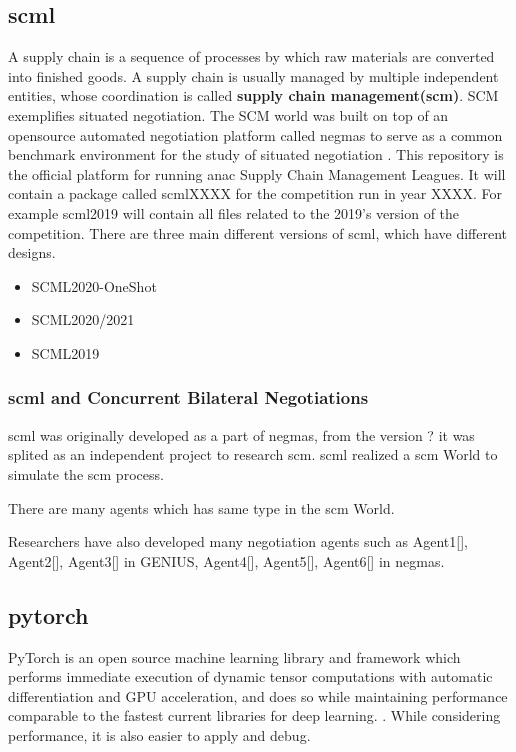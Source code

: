 \subsection{\gls{scml}} \label{background-scml}
A supply chain is a sequence of processes by which raw materials are converted into finished goods. A supply chain is usually managed by multiple independent entities, whose coordination is called \textbf{supply chain management(\gls{scm})}. SCM exemplifies situated negotiation. The SCM world was built on top of an opensource automated negotiation platform called \gls{negmas} to serve as a common benchmark environment for the study of situated negotiation \parencite{Mohammad2019}. This repository is the official platform for running \gls{anac} Supply Chain Management Leagues. It will contain a package called scmlXXXX for the competition run in year XXXX. For example scml2019 will contain all files related to the 2019’s version of the competition.
There are three main different versions of \gls{scml}, which have different designs.
\begin{itemize}
	\item SCML2020-OneShot
	\item SCML2020/2021
	\item SCML2019
\end{itemize}

\subsubsection{\gls{scml} and Concurrent Bilateral Negotiations}
\gls{scml} was originally developed as a part of \gls{negmas}, from the version ? it was splited as an independent project to research \gls{scm}. \gls{scml} realized a \gls{scm} World to simulate the \gls{scm} process.  

There are many agents which has same type in the \gls{scm} World. 

Researchers have also developed many negotiation agents such as Agent1[], Agent2[], Agent3[] in GENIUS, Agent4[], Agent5[], Agent6[] in \gls{negmas}.

\subsection{\gls{pytorch}} PyTorch is an open source machine learning library and framework which performs immediate execution of dynamic tensor computations with automatic differentiation and GPU acceleration, and does so while maintaining performance comparable to the fastest current libraries for deep learning. \parencite{NEURIPS2019_bdbca288}. While considering performance, it is also easier to apply and debug.

